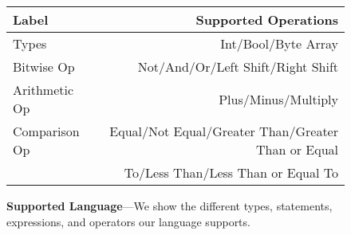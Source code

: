 \begin{figure}
        \centering
        \small
        \begin{tabularx}{\columnwidth}{lr}
        \toprule
        Label & Supported Operations\\
        \midrule
        Types &  Int/Bool/Byte Array \\
        Bitwise Op & Not/And/Or/Left Shift/Right Shift \\
        Arithmetic Op & Plus/Minus/Multiply \\
        Comparison Op & Equal/Not Equal/Greater Than/Greater Than or Equal \\
        & To/Less Than/Less Than or Equal To \\
        \bottomrule
        \end{tabularx}
        \caption{\textbf{Supported Language}---We show the different types,
        statements, expressions, and operators our language supports.}
    \label{table:functions}
\end{figure}

